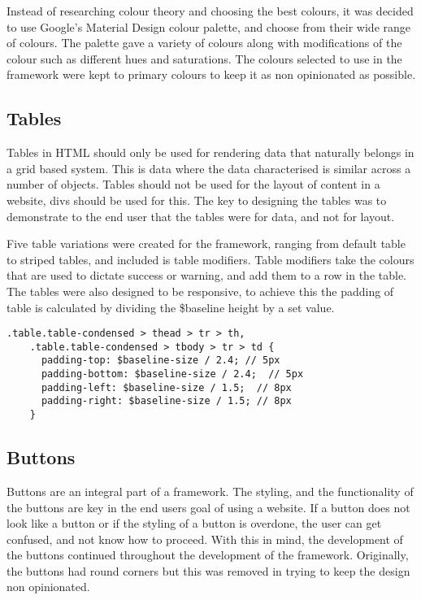 Instead of researching colour theory and choosing the best colours, it was decided to use Google's Material Design \citet{Google17} colour palette, and choose from their wide range of colours. The palette  gave a variety of colours along with modifications of the colour such as different hues and saturations. The colours selected to use in the framework were kept to primary colours to keep it as non opinionated as possible.

\newpage
\subsection*{Tables}
Tables in HTML should only be used for rendering data that naturally belongs in a grid based system. This is data where the data characterised is similar across a number of objects. Tables should not be used for the layout of content in a website, divs should be used for this. The key to designing the tables was to demonstrate to the end user that the tables were for data, and not for layout.

Five table variations were created for the framework, ranging from default table to striped tables, and included is table modifiers. Table modifiers take the colours that are used to dictate success or warning, and add them to a row in the table. The tables were also designed to be responsive, to achieve this the padding of table is calculated by dividing the \$baseline height by a set value. 

\begin{lstlisting}[language=CSS3]
    .table.table-condensed > thead > tr > th,
    .table.table-condensed > tbody > tr > td {
      padding-top: $baseline-size / 2.4; // 5px
      padding-bottom: $baseline-size / 2.4;  // 5px
      padding-left: $baseline-size / 1.5;  // 8px
      padding-right: $baseline-size / 1.5; // 8px
    }
\end{lstlisting}


\subsection*{Buttons}
Buttons are an integral part of a framework. The styling, and the functionality of the buttons are key in the end users goal of using a website. If a button does not look like a button or if the styling of a button is overdone, the user can get confused, and not know how to proceed. With this in mind, the development of the buttons continued throughout the development of the framework. Originally, the buttons had round corners but this was removed in trying to keep the design non opinionated. 

